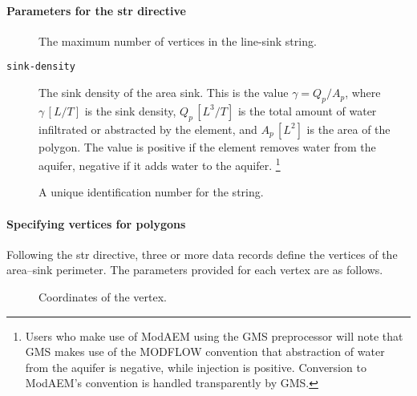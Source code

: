 \paragraph{Parameters for the str directive }
\begin{description}
  \item [] The maximum number of vertices in the line-sink
    string. \units{-}
  \item [{\texttt{sink-density}}] The sink density of the area sink. This
    is the value $\gamma=Q_{p}/A_{p}$, where $\gamma\,[L/T]$ is the
    sink density, $Q_{p}\,[L^{3}/T]$ is the total amount of water infiltrated
    or abstracted by the element, and $A_{p}\,[L^{2}]$ is the area of
    the polygon. The value is positive if the element removes water from
    the aquifer, negative if it adds water to the aquifer.
      \footnote{Users who make use of ModAEM using the GMS preprocessor will note
        that GMS makes use of the MODFLOW convention that abstraction of water
        from the aquifer is negative, while injection is positive. Conversion
        to ModAEM's convention is handled transparently by GMS.}
  \item [] A unique identification number for the string. \units{-} \end{description}

\paragraph{Specifying vertices for polygons}
Following the \textsf{str} directive, three or more data records define
the vertices of the area--sink perimeter. The parameters provided
for each vertex are as follows.
\begin{description}
  \item[] Coordinates of the vertex. 
\end{description}
